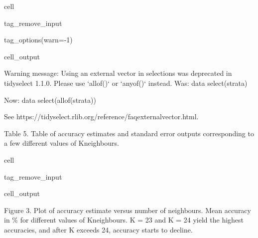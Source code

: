 \documentclass[letterpaper,10pt,english]{jupyterBook}
\begin{document}
\begin{sphinxuseclass}{cell}
\begin{sphinxuseclass}{tag_remove_input}
\begin{sphinxuseclass}{tag_options(warn=-1)}\begin{sphinxVerbatimOutput}

\begin{sphinxuseclass}{cell_output}
\begin{sphinxVerbatim}[commandchars=\\\{\}]
Warning message:
\PYGZdq{}Using an external vector in selections was deprecated in tidyselect 1.1.0.
 Please use `all\PYGZus{}of()` or `any\PYGZus{}of()` instead.
  \PYGZsh{} Was:
  data \PYGZpc{}\PYGZgt{}\PYGZpc{} select(strata)

  \PYGZsh{} Now:
  data \PYGZpc{}\PYGZgt{}\PYGZpc{} select(all\PYGZus{}of(strata))

See \PYGZlt{}https://tidyselect.r\PYGZhy{}lib.org/reference/faq\PYGZhy{}external\PYGZhy{}vector.html\PYGZgt{}.\PYGZdq{}
\end{sphinxVerbatim}

\end{sphinxuseclass}\end{sphinxVerbatimOutput}

\end{sphinxuseclass}
\end{sphinxuseclass}
\end{sphinxuseclass}
\sphinxAtStartPar
Table 5. Table of  accuracy estimates and standard error outputs corresponding to a few different values of K\sphinxhyphen{}neighbours.

\begin{sphinxuseclass}{cell}
\begin{sphinxuseclass}{tag_remove_input}\begin{sphinxVerbatimOutput}

\begin{sphinxuseclass}{cell_output}
\noindent{}

\end{sphinxuseclass}\end{sphinxVerbatimOutput}

\end{sphinxuseclass}
\end{sphinxuseclass}
\sphinxAtStartPar
Figure 3. Plot of accuracy estimate versus number of neighbours. Mean accuracy in \% for different values of K\sphinxhyphen{}neighbours. K = 23 and K = 24 yield the highest accuracies, and after K exceeds 24, accuracy starts to decline.
\end{document}
